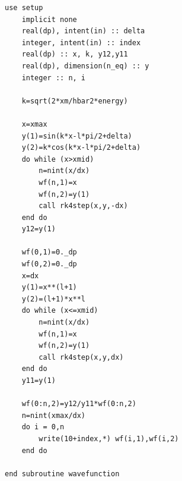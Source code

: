 \documentclass[12pt]{article}
\begin{document}
\begin{lstlisting}[frame=single,caption={ {\tt ho1d10.f95}},label=module]
    use setup
    implicit none
    real(dp), intent(in) :: delta
    integer, intent(in) :: index
    real(dp) :: x, k, y12,y11
    real(dp), dimension(n_eq) :: y
    integer :: n, i
    
    k=sqrt(2*xm/hbar2*energy)

    x=xmax
    y(1)=sin(k*x-l*pi/2+delta)
    y(2)=k*cos(k*x-l*pi/2+delta)
    do while (x>xmid)
        n=nint(x/dx)
        wf(n,1)=x
        wf(n,2)=y(1)
        call rk4step(x,y,-dx)
    end do
    y12=y(1)

    wf(0,1)=0._dp
    wf(0,2)=0._dp
    x=dx
    y(1)=x**(l+1)
    y(2)=(l+1)*x**l
    do while (x<=xmid)
        n=nint(x/dx)
        wf(n,1)=x
        wf(n,2)=y(1)
        call rk4step(x,y,dx)
    end do
    y11=y(1)

    wf(0:n,2)=y12/y11*wf(0:n,2)
    n=nint(xmax/dx)
    do i = 0,n
        write(10+index,*) wf(i,1),wf(i,2)
    end do

end subroutine wavefunction


\end{lstlisting}
\end{document}
